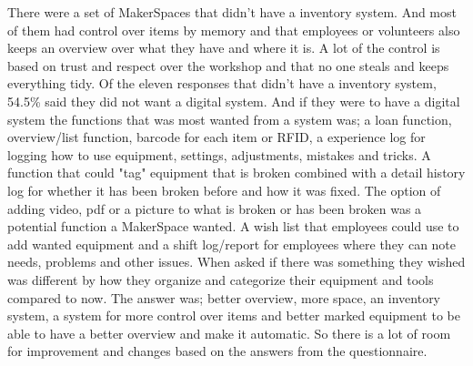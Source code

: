 There were a set of MakerSpaces that didn't have a inventory system. And most of them had control over items by memory and that employees or volunteers also keeps an overview over what they have and where it is. A lot of the control is based on trust and respect over the workshop and that no one steals and keeps everything tidy. Of the eleven responses that didn't have a inventory system, 54.5\% said they did not want a digital system. And if they were to have a digital system the functions that was most wanted from a system was; a loan function, overview/list function, barcode for each item or RFID, a experience log for logging how to use equipment, settings, adjustments, mistakes and tricks. A function that could "tag" equipment that is broken combined with a detail history log for whether it has been broken before and how it was fixed. The option of adding video, pdf or a picture to what is broken or has been broken was a potential function a MakerSpace wanted. A wish list that employees could use to add wanted equipment and a shift log/report for employees where they can note needs, problems and other issues. 
When asked if there was something they wished was different by how they organize and categorize their equipment and tools compared to now. The answer was; better overview, more space, an inventory system,  a system for more control over items and better marked equipment to be able to have a better overview and make it automatic. So there is a lot of room for improvement and changes based on the answers from the questionnaire.

